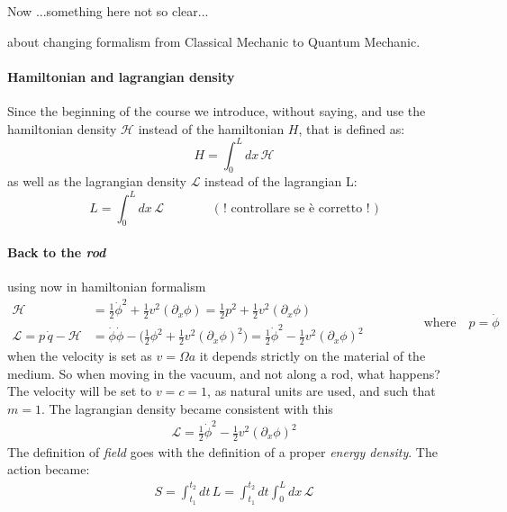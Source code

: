 \documentclass[class=article]{standalone}
\begin{document}
\vspace{10mm}
\large 
Now ...something here not so clear...

\normalsize
about changing formalism from Classical Mechanic to Quantum Mechanic.
\vspace{10mm}


\paragraph{Hamiltonian and lagrangian density}
Since the beginning of the course we introduce, without saying, and use the hamiltonian density $\mathcal{H}$ instead of the hamiltonian $H$, that is defined as:
\begin{equation*}
H = \int_0^L dx \, \mathcal{H}
\end{equation*}
as well as the lagrangian density $\mathcal{L}$ instead of the lagrangian L:
\begin{equation*}
L = \int_0^L dx \, \mathcal{L} \quad\quad\quad\quad \mbox{( ! controllare se è corretto ! )}
\end{equation*}


\paragraph{Back to the \emph{rod}} using now in hamiltonian formalism
\begin{equation*}
\begin{split}
\mathcal{H} & = \frac{1}{2} \dot \phi^2 + \frac{1}{2} v^2 (\partial_x \phi) 
= \frac{1}{2} p^2 + \frac{1}{2} v^2 (\partial_x \phi) \\
\mathcal{L}  = p \, \dot q - \mathcal{H} & = \dot\phi \dot\phi - \Big( \frac{1}{2} \phi^2  +  \frac{1}{2} v^2 (\partial_x \phi)^2  \Big) 
= \frac{1}{2} \dot \phi^2 - \frac{1}{2} v^2 (\partial_x \phi)^2 
\end{split}\quad\quad\quad\quad
\begin{split}
\mbox{where}\quad p = \dot \phi 
\end{split}
\end{equation*}
when the velocity is set as $v = \Omega a$ it depends strictly on the material of the medium.
So when moving in the vacuum, and not along a rod, what happens? 
The velocity will be set to $v = c = 1$, as natural units are used, and  such that $m=1$.
The lagrangian density became consistent with this
\begin{equation}
\begin{split}
\mathcal{L} = \frac{1}{2} \dot \phi^2 - \frac{1}{2} v^2 (\partial_x \phi)^2 
\end{split}
\label{eq:lagrangian_phi}
\end{equation}
The definition of \emph{field} goes with the definition of a proper \emph{energy density}.
The action became:
\begin{equation*}
\begin{split}
S = \int_{t_1}^{t_2} dt \, L =  \int_{t_1}^{t_2} dt \int_0^L dx \, \mathcal{L}
\end{split}
\end{equation*}
\end{document}
